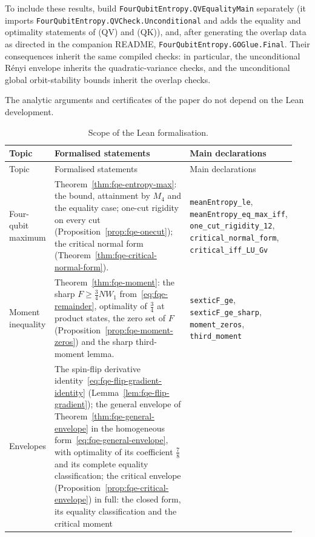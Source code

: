 To include these results, build \nolinkurl{FourQubitEntropy.QVEqualityMain} separately (it imports
\nolinkurl{FourQubitEntropy.QVCheck.Unconditional} and adds the equality and optimality statements of (QV) and (QK)), and, after generating
the overlap data as directed in the companion README, \nolinkurl{FourQubitEntropy.GOGlue.Final}.
Their consequences inherit the same compiled checks: in particular, the unconditional R\'enyi envelope inherits
the quadratic-variance checks, and the unconditional global orbit-stability bounds inherit the overlap checks.

The analytic arguments and certificates of the paper do not depend on the Lean
development.

{\small
\begin{longtable}{@{}>{\raggedright\arraybackslash}p{0.14\linewidth}>{\raggedright\arraybackslash}p{0.49\linewidth}>{\raggedright\arraybackslash}p{0.31\linewidth}@{}}
\caption{Scope of the Lean formalisation.}\label{tab:fqe-lean}\\
\toprule
Topic & Formalised statements & Main declarations \\
\midrule
\endfirsthead
\toprule
Topic & Formalised statements & Main declarations \\
\midrule
\endhead
Four-qubit maximum &
Theorem~\ref{thm:fqe-entropy-max}: the bound, attainment by $M_4$ and the equality case; one-cut rigidity on every cut
(Proposition~\ref{prop:fqe-onecut}); the critical normal form (Theorem~\ref{thm:fqe-critical-normal-form}). &
\texttt{meanEntropy\_le}, \texttt{meanEntropy\_eq\_max\_iff}, \texttt{one\_cut\_rigidity\_12}, \texttt{critical\_normal\_form}, \texttt{critical\_iff\_LU\_Gv}\\
Moment inequality &
Theorem~\ref{thm:fqe-moment}: the sharp $F\ge\frac34NW_1$ from~\eqref{eq:fqe-remainder}, optimality of $\frac34$ at
product states, the zero set of $F$ (Proposition~\ref{prop:fqe-moment-zeros}) and the sharp third-moment lemma. &
\texttt{sexticF\_ge}, \texttt{sexticF\_ge\_sharp}, \texttt{moment\_zeros}, \texttt{third\_moment}\\
Envelopes &
The spin-flip derivative identity~\eqref{eq:fqe-flip-gradient-identity} (Lemma~\ref{lem:fqe-flip-gradient}); the
general envelope of Theorem~\ref{thm:fqe-general-envelope} in the homogeneous form~\eqref{eq:fqe-general-envelope}, with
optimality of its coefficient $\frac78$ and its complete equality classification; the critical envelope
(Proposition~\ref{prop:fqe-critical-envelope}) in full: the closed form, its equality classification and the critical moment

\end{longtable}}

